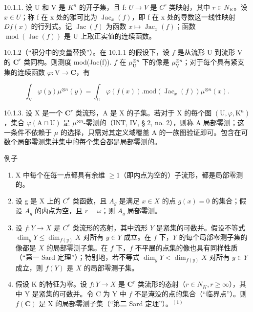 10.1.1. 设 U 和 V 是 \(K^{n}\) 的开子集，且 f: \(U \to V\) 是 \(C^{r}\) 类映射，其中 \(r \in N_{K}\)。设 \(x \in U\)；称 f 在 x 处的雅可比为 \(\operatorname{Jac}_{x}(f)\)，即 f 在 x 处的导数这一线性映射 \(Df(x)\) 的行列式。记 \(\operatorname{Jac}(f)\) 为函数 \(x \mapsto \operatorname{Jac}_{x}(f)\)；函数 \(\operatorname{mod}(\operatorname{Jac}(f))\) 是 U 上取正实值的连续函数。

10.1.2（“积分中的变量替换”）。在 10.1.1 的假设下，设 \(f\) 是从流形 U 到流形 V 的 \(\mathbf{C}^{r}\) 类同构。则测度 mod(Jac(f)). \(f\) 在 \(\mu_{\mathrm{U}}^{\otimes n}\) 下的像是 \(\mu_{\mathrm{V}}^{\otimes n}\)；对于每个具有紧支集的连续函数 \(\varphi: \mathrm{V} \to \mathbf{C}\)，有

\[
\int_ {\mathrm{V}} \varphi (y) \mu^ {\otimes n} (y) = \int_ {\mathrm{U}} \varphi (f (x)). \mathrm{mod} (\operatorname{Jac} _ {x} (f)) \mu^ {\otimes n} (x).\tag{1}
\]

10.1.3. 设 X 是一个 \(\mathbf{C}^r\) 类流形，A 是 X 的子集。若对于 X 的每个图 \((\mathrm{U},\varphi ,\mathrm{K}^n)\)，集合 \(\varphi (\mathrm{A}\cap \mathrm{U})\) 是 \(\mu^{\otimes n}\)-零测的（INT, IV, § 2, no. 2），则称 A 局部零测；这一条件不依赖于 \(\mu\) 的选择，只需对其定义域覆盖 A 的一族图验证即可。包含在可数个局部零测集并集中的每个集合都是局部零测的。

例子

\begin{enumerate}
\def\labelenumi{\alph{enumi})}
\item
  X 中每个在每一点都具有余维 \(\geqslant1\)（即内点为空的）子流形，都是局部零测的。
\item
  设 g 是 X 上的 \(C^{r}\) 类函数，且 \(A_{g}\) 是满足 \(x \in X\) 的点 \(g(x) = 0\) 的集合；假设 \(A_{g}\) 的内点为空，且 \(r = \omega\)；则 \(A_{g}\) 局部零测。
\item
  设 \(f: Y \to X\) 是 \(C^{r}\) 类流形的态射，其中流形 \(Y\) 是紧集的可数并。假设不等式 \(\dim_{y} Y \leqslant \dim_{f(y)} X\) 对所有 \(y \in Y\) 成立。在 \(f\) 下，\(Y\) 的每个局部零测子集的像都是 \(X\) 的局部零测子集。在 \(f\) 下，\(f\) 不平展的点集的像也具有同样性质（“第一 Sard 定理”）；特别地，若不等式 \(\dim_{y} Y < \dim_{f(y)} X\) 对所有 \(y \in Y\) 成立，则 \(f(Y)\) 是 \(X\) 的局部零测子集。
\item
  假设 K 的特征为零。设 \(f\colon Y\to X\) 是 \(\mathbf{C}^{r}\) 类流形的态射（\(r\in N_{K}, r\geqslant\infty\)），其中 Y 是紧集的可数并。令 C 为 Y 中 \(f\) 不是淹没的点的集合（“临界点”）。则 \(f(\mathbf{C})\) 是 X 的局部零测子集（“第二 Sard 定理”）。\(^{(1)}\)
\end{enumerate}

